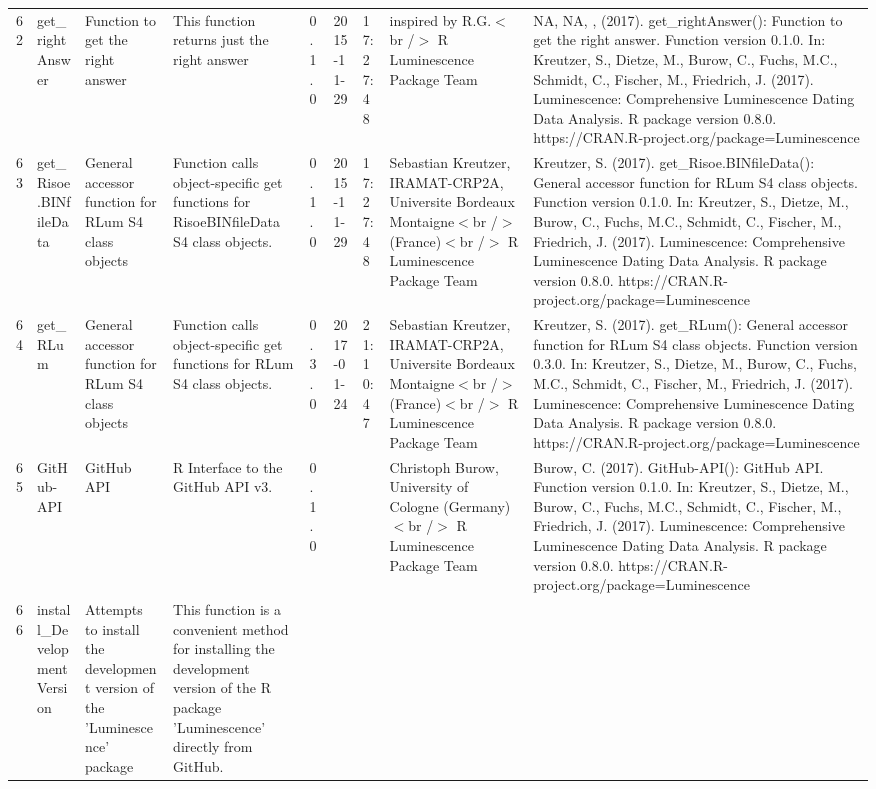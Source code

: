 \begin{table}[ht]
\begin{tabular}{rllllllll}
 \\ 
  62 & get\_rightAnswer & Function to get the right answer & This function returns just the right answer & 0.1.0 & 2015-11-29 & 17:27:48
 & inspired by R.G.$<$br /$>$  R Luminescence Package Team & NA, NA, ,  (2017). get\_rightAnswer(): Function to get the right answer. Function version 0.1.0. In: Kreutzer, S., Dietze, M., Burow, C., Fuchs, M.C., Schmidt, C., Fischer, M., Friedrich, J. (2017). Luminescence: Comprehensive Luminescence Dating Data Analysis. R package version 0.8.0. https://CRAN.R-project.org/package=Luminescence
 \\ 
  63 & get\_Risoe.BINfileData & General accessor function for RLum S4 class objects & Function calls object-specific get functions for RisoeBINfileData S4 class objects. & 0.1.0 & 2015-11-29 & 17:27:48
 & Sebastian Kreutzer, IRAMAT-CRP2A, Universite Bordeaux Montaigne$<$br /$>$ (France)$<$br /$>$  R Luminescence Package Team & Kreutzer, S. (2017). get\_Risoe.BINfileData(): General accessor function for RLum S4 class objects. Function version 0.1.0. In: Kreutzer, S., Dietze, M., Burow, C., Fuchs, M.C., Schmidt, C., Fischer, M., Friedrich, J. (2017). Luminescence: Comprehensive Luminescence Dating Data Analysis. R package version 0.8.0. https://CRAN.R-project.org/package=Luminescence
 \\ 
  64 & get\_RLum & General accessor function for RLum S4 class objects & Function calls object-specific get functions for RLum S4 class objects. & 0.3.0 & 2017-01-24 & 21:10:47
 & Sebastian Kreutzer, IRAMAT-CRP2A, Universite Bordeaux Montaigne$<$br /$>$ (France)$<$br /$>$  R Luminescence Package Team & Kreutzer, S. (2017). get\_RLum(): General accessor function for RLum S4 class objects. Function version 0.3.0. In: Kreutzer, S., Dietze, M., Burow, C., Fuchs, M.C., Schmidt, C., Fischer, M., Friedrich, J. (2017). Luminescence: Comprehensive Luminescence Dating Data Analysis. R package version 0.8.0. https://CRAN.R-project.org/package=Luminescence
 \\ 
  65 & GitHub-API & GitHub API & R Interface to the GitHub API v3. & 0.1.0
 &  &  & Christoph Burow, University of Cologne (Germany)$<$br /$>$  R Luminescence Package Team & Burow, C. (2017). GitHub-API(): GitHub API. Function version 0.1.0. In: Kreutzer, S., Dietze, M., Burow, C., Fuchs, M.C., Schmidt, C., Fischer, M., Friedrich, J. (2017). Luminescence: Comprehensive Luminescence Dating Data Analysis. R package version 0.8.0. https://CRAN.R-project.org/package=Luminescence
 \\ 
  66 & install\_DevelopmentVersion & Attempts to install the development version of the 'Luminescence' package & This function is a convenient method for installing the development version of the R package 'Luminescence' directly from GitHub. &  &  &  &  &  \\ 

\end{tabular}
\end{table}
